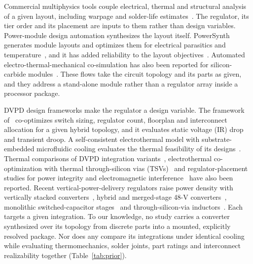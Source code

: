 Commercial multiphysics tools couple electrical, thermal and structural analysis of a given
layout, including warpage and solder-life
estimates~\cite{Synopsys_RedHawkSC_ET,Cadence_Celsius,Ansys_Sherlock,Keysight_PIPro}. The
regulator, its tier order and its placement are inputs to them rather than design variables.
Power-module design automation synthesizes the layout itself. PowerSynth generates module layouts
and optimizes them for electrical parasitics and
temperature~\cite{Evans2019PowerSynth,AlRazi2021PowerSynth25D,AlRazi2023PowerSynth2}, and it has
added reliability to the layout objectives~\cite{AlRazi2021PowerSynthReliability}. Automated
electro-thermal-mechanical co-simulation has also been reported for silicon-carbide
modules~\cite{Yang2021ETMCosimSiC}. These flows take the circuit topology and its parts as given,
and they address a stand-alone module rather than a regulator array inside a processor package.

DVPD design frameworks make the regulator a design variable. The framework
of~\cite{Krishnakumar2026DVPD} co-optimizes switch sizing, regulator count, floorplan and
interconnect allocation for a given hybrid topology, and it evaluates static voltage (IR) drop
and transient droop. A self-consistent electrothermal model with substrate-embedded microfluidic
cooling evaluates the thermal feasibility of its
designs~\cite{Choi2025SelfConsistent,Choi2025AutoET}. Thermal comparisons of DVPD
integration variants~\cite{Choi2024ITherm,Choi2025EmbeddedCooling}, electrothermal
co-optimization with thermal through-silicon vias (TSVs)~\cite{Wang2025TTSV} and
regulator-placement studies for power integrity and electromagnetic
interference~\cite{Xu2019VRplacement,Hossen2020DSEarXiv,Zhang2019PDNbenchmark} have also been
reported. Recent vertical-power-delivery regulators raise power density with vertically stacked
converters~\cite{Baek2022LEGOPoL,vertical_stacking_2025_TRansactions_power_electronics}, hybrid
and merged-stage 48-V converters~\cite{Wang2023MSCPoL,Yan2026VPD48V1V}, monolithic
switched-capacitor stages~\cite{Liu2025MonolithicSCVR,Gong2026SCCurrentMultiplier} and
through-silicon-via inductors~\cite{Ding2026TSVCoupledInductor}. Each targets a given
integration. To our knowledge, no study carries a converter synthesized over its topology from
discrete parts into a mounted, explicitly resolved package. Nor does any compare its integrations
under identical cooling while evaluating thermomechanics, solder joints, part ratings and
interconnect realizability together (Table~\ref{tab:prior}).

